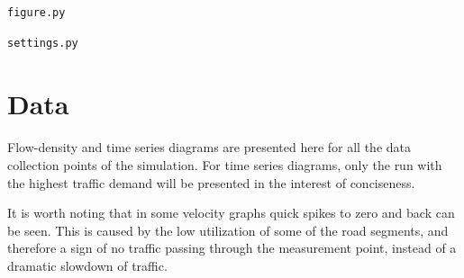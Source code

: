 \documentclass[english, 12pt, a4paper, elec, utf8, pdfa, online]{aaltothesis}
\begin{document}
\begin{verbatim}figure.py\end{verbatim}


\begin{verbatim}settings.py\end{verbatim}


\clearpage

\section{Data} \label{graphs}

Flow-density and time series diagrams are presented here for all the data collection points of the simulation. For time series diagrams, only the run with the highest traffic demand will be presented in the interest of conciseness.

It is worth noting that in some velocity graphs quick spikes to zero and back can be seen. This is caused by the low utilization of some of the road segments, and therefore a sign of no traffic passing through the measurement point, instead of a dramatic slowdown of traffic.
\end{document}

